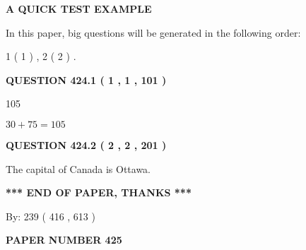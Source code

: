 \documentclass[12pt]{article}
\begin{document}
   
   
   
 \vspace{0.2in}
{\LARGE {\textbf{ A QUICK TEST EXAMPLE}}}
   
   
   
\vspace{0.2in}
   
In this paper, big questions will be generated in the following order: 
   
   
   1 ( 1 )
 ,
   2 ( 2 )
 .
  
\vspace{0.2in}
  
{\textbf{\Large{QUESTION
424.1 
 ( 1 , 1 , 101 )
}}}
  
  
 
 
\noindent{}

105
 
 
 
 
\noindent{}

$ %
30 +  %
75=   %
105$
 
 
  
\vspace{0.2in}
  
{\textbf{\Large{QUESTION
424.2 
 ( 2 , 2 , 201 )
}}}
  
  
 
 
\noindent{}
 
 
The capital of Canada is Ottawa.
 
 
 
 
   
   
 \vspace{0.2in}
 
   
   
   
   
\vspace{1.0in} 
{\textbf{\large{ *** END OF PAPER, THANKS *** }}} 
   
   
\hspace{1.0in} By: 
 239 ( 416 ,  613 )
   
   
   
   
\newpage 
\setcounter{page}{ 
   425001 } 
   
   
   
   
 {\textbf{ \Large{ PAPER NUMBER  425  }}}
   
\end{document}
